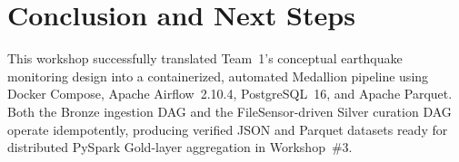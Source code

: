 \section{Conclusion and Next Steps}
This workshop successfully translated Team~1's conceptual earthquake monitoring design into a containerized, automated Medallion pipeline using Docker Compose, Apache Airflow~2.10.4, PostgreSQL~16, and Apache Parquet. Both the Bronze ingestion DAG and the FileSensor-driven Silver curation DAG operate idempotently, producing verified JSON and Parquet datasets ready for distributed PySpark Gold-layer aggregation in Workshop~\#3.
